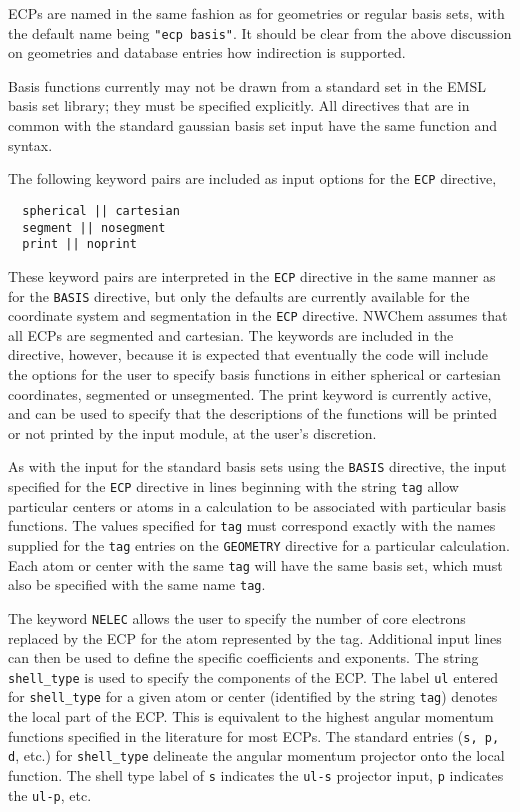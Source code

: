ECPs are named in the same fashion as for geometries or regular basis
sets, with the default name being \verb+"ecp basis"+.  It should be
clear from the above discussion on geometries and database entries how
indirection is supported.

Basis functions currently may not be drawn from a standard set in the
EMSL basis set library; they must be specified explicitly.  All
directives that are in common with the standard gaussian basis set
input have the same function and syntax.

The following keyword pairs are included as input options for the 
\verb+ECP+ directive,
\begin{verbatim}
  spherical || cartesian
  segment || nosegment
  print || noprint
\end{verbatim}

These keyword pairs are interpreted in the \verb+ECP+ directive in the
same manner as for the \verb+BASIS+ directive, but only the defaults
are currently available for the coordinate system and segmentation in
the \verb+ECP+ directive.  NWChem assumes that all ECPs are segmented
and cartesian.  The keywords are included in the directive, however,
because it is expected that eventually the code will include the
options for the user to specify basis functions in either spherical or
cartesian coordinates, segmented or unsegmented.  The print keyword is
currently active, and can be used to specify that the descriptions of
the functions will be printed or not printed by the input module, at
the user's discretion.

As with the input for the standard basis sets using the \verb+BASIS+
directive, the input specified for the \verb+ECP+ directive in lines
beginning with the string \verb+tag+ allow particular centers or atoms
in a calculation to be associated with particular basis functions.
The values specified for \verb+tag+ must correspond exactly with the
names supplied for the \verb+tag+ entries on the \verb+GEOMETRY+
directive for a particular calculation.  Each atom or center with the
same \verb+tag+ will have the same basis set, which must also be
specified with the same name \verb+tag+.

The keyword \verb+NELEC+ allows the user to specify the number of core
electrons replaced by the ECP for the atom represented by the tag.
Additional input lines can then be used to define the specific
coefficients and exponents.  The string \verb+shell_type+ is used to
specify the components of the ECP.  The label \verb+ul+ entered for
\verb+shell_type+ for a given atom or center (identified by the string
\verb+tag+) denotes the local part of the ECP.  This is equivalent to
the highest angular momentum functions specified in the literature for
most ECPs.  The standard entries (\verb+s, p, d+, etc.) for
\verb+shell_type+ delineate the angular momentum projector onto the
local function.  The shell type label of \verb+s+ indicates the
\verb+ul-s+ projector input, \verb+p+ indicates the \verb+ul-p+, etc.


